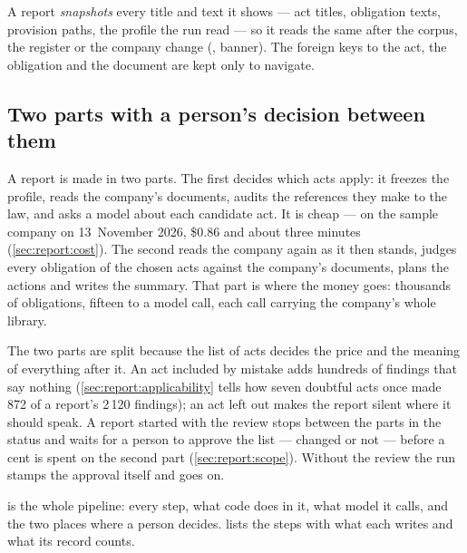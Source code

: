 A report \emph{snapshots} every title and text it shows --- act titles, obligation texts, provision paths, the profile the run read --- so
it reads the same after the corpus, the register or the company change
(, banner). The foreign keys to the act, the obligation and the
document are kept only to navigate.

\subsection{Two parts with a person's decision between them}

A report is made in two parts. The first decides which acts apply: it freezes the profile,
reads the company's documents, audits the references they make to the law, and asks a model
about each candidate act. It is cheap --- on the sample company on 13~November 2026, \$0.86 and
about three minutes (\cref{sec:report:cost}). The second reads the company again as it then
stands, judges every obligation of the chosen acts
against the company's documents, plans the actions and writes the summary. That part is where
the money goes: thousands of obligations, fifteen to a model call, each call carrying the
company's whole library.

The two parts are split because the list of acts decides the price and the meaning of
everything after it. An act included by mistake adds hundreds of findings that say nothing
(\cref{sec:report:applicability} tells how seven doubtful acts once made 872 of a report's
2\,120 findings); an act left out makes the report silent where it should speak. A report
started with the review stops between the parts in the status  and waits
for a person to approve the list --- changed or not --- before a cent is spent on the second
part (\cref{sec:report:scope}). Without the review the run stamps the approval itself and goes
on.

 is the whole pipeline: every step, what code does in it, what model
it calls, and the two places where a person decides.  lists the steps
with what each writes and what its record counts.

